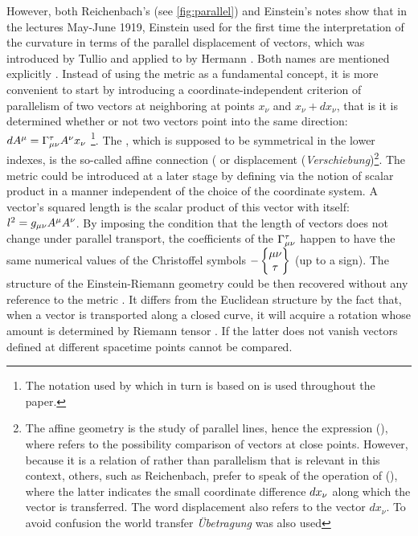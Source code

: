 \documentclass[draft]{article}
\newcommand{\xdx}{\ensuremath{x_\nu} and \ensuremath{x_\nu + dx_\nu}\xspace}
\begin{document}
However, both Reichenbach's (see \cref{fig:parallel}) and Einstein's notes show that in the lectures May-June 1919, Einstein used for the first time the interpretation of the curvature in terms of the parallel displacement of vectors, which was introduced by Tullio \citet{Levi-Civita1916} and applied to \rt by Hermann \citet{Weyl1918}. Both names are mentioned explicitly \citep[028-01-03, 33]{HR}. Instead of using the metric as a fundamental concept, it is more convenient to start by introducing a coordinate-independent criterion of parallelism of two vectors at neighboring at points \xdx, that is it is determined whether or not two vectors point into the same direction: $dA^\mu=\Gamma^\tau_{\mu\nu} A^\nu x_\nu$ \citep[028-01-03, 33]{HR}\footnote{The notation used by \citet{Reichenbach1928} which in turn is based on \citet{Eddington1923,Eddington1925} is used throughout the paper.}. The \Gtmn, which is supposed to be symmetrical in the lower indexes, is the so-called affine connection ( or displacement (\textit{Verschiebung})\footnote{The affine geometry is the study of parallel lines, \citet{Weyl1918b} hence the expression  (), where  refers to the possibility comparison of vectors at close points. However, because it is a relation of  rather than parallelism that is relevant in this context, others, such as Reichenbach, prefer to speak of the operation of  (), where the latter indicates the small coordinate difference $dx_{\nu}$ along which the vector is transferred. The word displacement also refers to the vector $dx_\nu$. To avoid confusion the world transfer \textit{Übetragung} was also used}. The metric could be introduced at a later stage by defining via the notion of scalar product in a manner independent of the choice of the coordinate system. A vector's squared length is the scalar product of this vector with itself: $l^2=g_{\mu\nu} A^\mu A^\nu$. By imposing the condition that the length of vectors does not change under parallel transport, the coefficients of the $\Gamma^\tau_{\mu\nu}$ happen to have the same numerical values of the Christoffel symbols $- \begin{Bmatrix} \mu \nu \\ \tau \end{Bmatrix}$ (up to a sign). The structure of the Einstein-Riemann geometry could be then recovered without any reference to the metric \gmn. It differs from the Euclidean structure by the fact that, when a vector is transported along a closed curve, it will acquire a rotation whose amount is determined by Riemann tensor \riteg. If the latter does not vanish vectors defined at different spacetime points cannot be compared.
\end{document}
